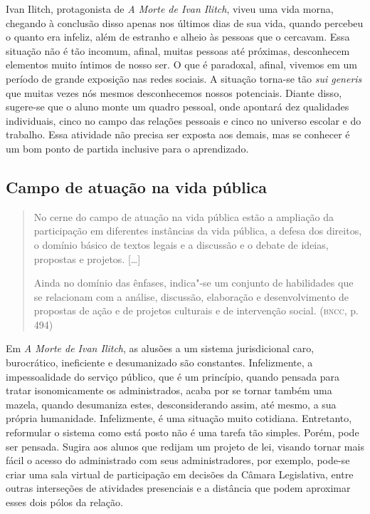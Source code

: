\documentclass[12pt]{extarticle}
\begin{document}
Ivan Ilitch, protagonista de \emph{A Morte de Ivan Ilitch}, viveu uma
vida morna, chegando à conclusão disso apenas nos últimos dias de sua
vida, quando percebeu o quanto era infeliz, além de estranho e alheio
às pessoas que o cercavam. Essa situação não é tão incomum, afinal,
muitas pessoas até próximas, desconhecem elementos muito íntimos de
nosso ser. O que é paradoxal, afinal, vivemos em um período de grande
exposição nas redes sociais. A situação torna-se tão \emph{sui
generis} que muitas vezes nós mesmos desconhecemos nossos potenciais.
Diante disso, sugere-se que o aluno monte um quadro pessoal, onde
apontará dez qualidades individuais, cinco no campo das relações
pessoais e cinco no universo escolar e do trabalho. Essa atividade não
precisa ser exposta aos demais, mas se conhecer é um bom ponto de
partida inclusive para o aprendizado.

\subsection{Campo de atuação na vida pública}

\begin{quote}
No cerne do campo de atuação na vida pública estão a ampliação da
participação em diferentes instâncias da vida pública, a defesa dos
direitos, o domínio básico de textos legais e a discussão e o debate de
ideias, propostas e projetos. {[}\ldots{}{]}

Ainda no domínio das ênfases, indica"-se um conjunto de habilidades que
se relacionam com a análise, discussão, elaboração e desenvolvimento de
propostas de ação e de projetos culturais e de intervenção social.
(\textsc{bncc}, p. 494)
\end{quote}

Em \emph{A Morte de Ivan Ilitch}, as alusões a um sistema
jurisdicional caro, burocrático, ineficiente e desumanizado são
constantes. Infelizmente, a impessoalidade do serviço público, que é
um princípio, quando pensada para tratar isonomicamente os
administrados, acaba por se tornar também uma mazela, quando
desumaniza estes, desconsiderando assim, até mesmo, a sua própria
humanidade. Infelizmente, é uma situação muito cotidiana. Entretanto,
reformular o sistema como está posto não é uma tarefa tão simples.
Porém, pode ser pensada. Sugira aos alunos que redijam um projeto de
lei, visando tornar mais fácil o acesso do administrado com seus
administradores, por exemplo, pode-se criar uma sala virtual de
participação em decisões da Câmara Legislativa, entre outras
interseções de atividades presenciais e a distância que podem
aproximar esses dois pólos da relação.
\end{document}

